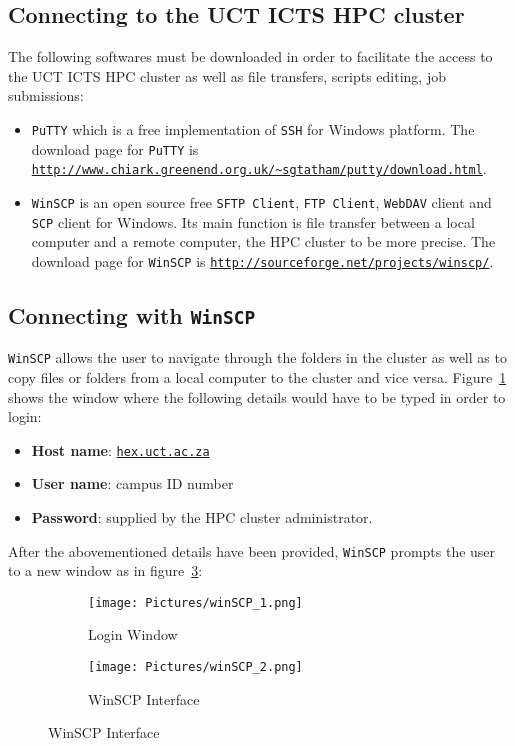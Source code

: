 \subsection{Connecting to the UCT ICTS HPC cluster}
The following softwares must be downloaded in order to facilitate the access to the UCT ICTS HPC cluster as well as file transfers, scripts editing, job submissions:
\begin{itemize}
\item \texttt{PuTTY} which is a free implementation of \texttt{SSH} for Windows platform. The download page for \texttt{PuTTY} is \\ \href{http://www.chiark.greenend.org.uk/~sgtatham/putty/download.html}{\texttt{http://www.chiark.greenend.org.uk/\textasciitilde sgtatham/putty/download.html}}.
\item \texttt{WinSCP} is an open source free \texttt{SFTP Client}, \texttt{FTP Client}, \texttt{WebDAV} client and \texttt{SCP} client for Windows. Its main function is file transfer between a local computer and a remote computer, the HPC cluster to be more precise. The download page for \texttt{WinSCP} is \href{http://sourceforge.net/projects/winscp/}{\texttt{http://sourceforge.net/projects/winscp/}}. 
\end{itemize}

\clearpage
\subsection*{Connecting with \texttt{WinSCP}}
\texttt{WinSCP} allows the user to navigate through the folders in the cluster as well as to copy files or folders from a local computer to the cluster and vice versa. Figure~\ref{fig:Login Window} shows the window where the following details would have to be typed in order to login:
\begin{itemize}
\item \textbf{Host name}: \href{http://hex.uct.ac.za/}{\texttt{hex.uct.ac.za}}
\item \textbf{User name}: campus ID number
\item \textbf{Password}: supplied by the HPC cluster administrator.
\end{itemize}
After the abovementioned details have been provided, \texttt{WinSCP} prompts the user to a new window as in figure~\ref{fig:WinSCP Interface}:
\begin{figure}[ht]
  \centering
    \begin{subfigure}{\textwidth}
                    \texttt{[image: Pictures/winSCP\_1.png]}
                    \caption[Login Window]{Login Window}
                    \label{fig:Login Window}
     \end{subfigure}
     \begin{subfigure}{\textwidth}
         \texttt{[image: Pictures/winSCP\_2.png]}
         \caption[WinSCP Interface]{WinSCP Interface}
          \label{fig:WinSCP Interface}
     \end{subfigure}
\end{figure}
\clearpage
